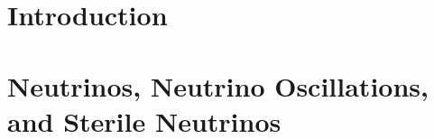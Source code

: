 \documentclass[11pt,openright,twoside,letterpaper,onecolumn]{report} %
\begin{document}
\linenumbers %

\pagestyle{empty}

\thesistitlepage
\thesiscopyrightpage



\pagestyle{plain}

\setlength{\footskip}{0.5in}

\setcounter{tocdepth}{2}
\renewcommand{\contentsname}{Table of Contents}
\tableofcontents
\cleardoublepage

\listoffigures
\cleardoublepage

\listoftables
\cleardoublepage


\cleardoublepage



\pagestyle{headings}

%
%
\setlength{\textheight}{8.5in}
\setlength{\footskip}{0in}




 {%
\fancyhf{}
\fancyhead[LE,RO]{\thepage}
\fancyhead[RE,LO]{\itshape \leftmark}
\renewcommand{\headrulewidth}{0pt}
}
\pagestyle{plain}

\chapter{Introduction}
\label{section:intro}


\chapter{Neutrinos, Neutrino Oscillations, and Sterile Neutrinos}
\label{sec:theory}

\end{document}

